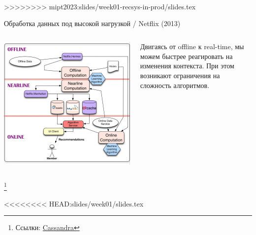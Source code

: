 \documentclass[11pt,aspectratio=169,handout]{beamer}
\begin{document}
>>>>>>>> mipt2023:slides/week01-recsys-in-prod/slides.tex
\begin{frame}{Обработка данных под высокой нагрузкой / Netflix (2013) \cite{NFLX}}

\begin{columns}
\begin{column}{0.6\textwidth}
   \begin{center}
		\includegraphics[scale=0.1]{images/netflix.png}
   \end{center}
\end{column}
\begin{column}{0.35\textwidth}
    \begin{small}
    \begin{tcolorbox}[colback=info!5,colframe=info!80,title=]
    Двигаясь от offline к real-time, мы можем быстрее реагировать на изменения контекста. При этом возникают ограничения на сложность алгоритмов.
    \end{tcolorbox}
    \end{small}
\end{column}
\end{columns}

\footnote{Ссылки:
\href{https://cassandra.apache.org/_/index.html}{Cassandra}
}

<<<<<<<< HEAD:slides/week01/slides.tex

\end{frame}
\end{document}
